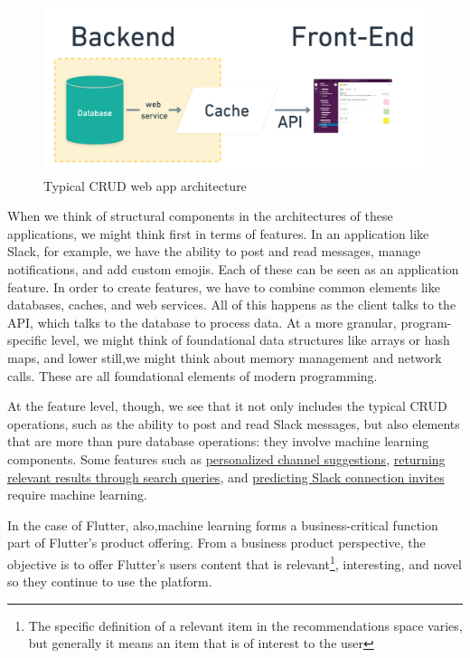 \documentclass[draft, 11pt]{diazessay} %
\begin{document}
\begin{figure}[H]
\centering
\includegraphics[width=.9\textwidth]{figures/web_service.png}
\caption{Typical CRUD web app architecture}
\end{figure}

When we think of structural components in the architectures of these applications, we might think first in terms of features. In an application like Slack, for example, we have the ability to post and read messages, manage notifications, and add custom emojis. Each of these can be seen as an application feature. In order to create features, we have to combine common elements like databases, caches, and web services. All of this happens as the client talks to the API, which talks to the database to process data. At a more granular, program-specific level, we might think of foundational data structures like arrays or hash maps, and lower still,we might think about memory management and network calls. These are all foundational elements of modern programming. 

At the feature level, though, we see that it not only includes the typical CRUD operations, such as the ability to post and read Slack messages, but also elements that are more than pure database operations: they involve machine learning components. Some features such as \href{https://slack.engineering/personalized-channel-recommendations-in-slack/}{personalized channel suggestions}, \href{https://slack.engineering/search-at-slack/}{returning relevant results through search queries}, and \href{https://slack.engineering/email-classification/}{predicting Slack connection invites} require machine learning.

In the case of Flutter, also,machine learning forms a business-critical function part of Flutter's product offering. From a business product perspective, the objective is to offer Flutter’s users content that is relevant\footnote{The specific definition of a relevant item in the recommendations space varies, but generally it means an item that is of interest to the user}, interesting, and novel so they continue to use the platform. 
\end{document}
